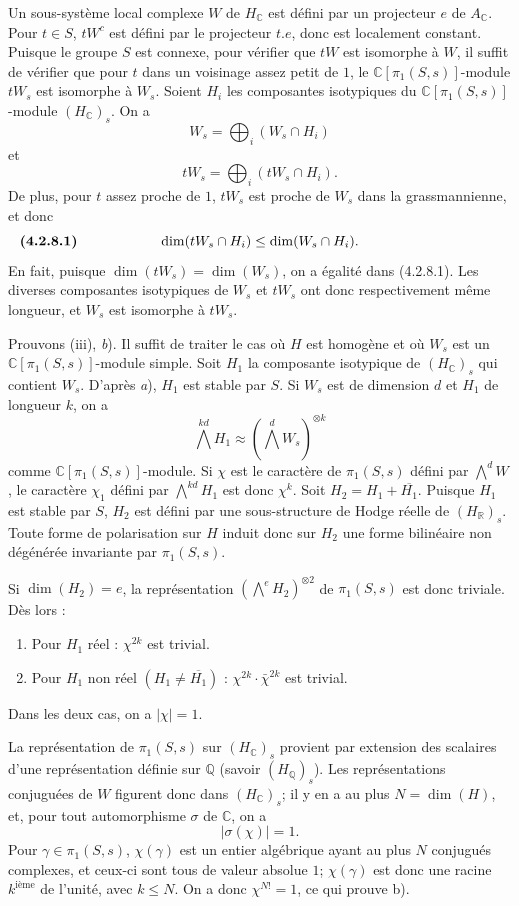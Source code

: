 \documentclass[10pt]{article}
\newcommand{\C}{\mathbb C}
\newcommand{\Q}{\mathbb Q}
\newcommand{\R}{\mathbb R}
\begin{document}
Un sous-système local complexe $W$ de $H_\C$ est défini par un projecteur $e$ de $A_\C$. Pour $t\in S$, $tW^c$ est défini par le projecteur $t.e$, donc est localement constant. Puisque le groupe $S$ est connexe, pour vérifier que $tW$ est isomorphe à $W$, il suffit de vérifier que pour $t$ dans un voisinage assez petit de $1$, le $\C[\pi_1(S,s)]$-module $tW_s$ est isomorphe à $W_s$. Soient $H_i$ les composantes isotypiques du $\C[\pi_1(S,s)]$-module $(H_\C)_s$. On a
\[
W_s=\bigoplus_i(W_s\cap H_i)
\]
et
\[
tW_s=\bigoplus_i(tW_s\cap H_i).
\]
De plus, pour $t$ assez proche de $1$, $tW_s$ est proche de $W_s$ dans la grassmannienne, et donc
\[
\makebox[\textwidth][s]{\textbf{(4.2.8.1)}\hfill$\displaystyle \dim(tW_s\cap H_i)\le \dim(W_s\cap H_i).$\hfill\phantom{\textbf{(4.2.8.1)}}}
\]
En fait, puisque $\dim(tW_s)=\dim(W_s)$, on a égalité dans (4.2.8.1). Les diverses composantes isotypiques de $W_s$ et $tW_s$ ont donc respectivement même longueur, et $W_s$ est isomorphe à $tW_s$.

Prouvons (iii), \textit{b}). Il suffit de traiter le cas où $H$ est homogène et où $W_s$ est un $\C[\pi_1(S,s)]$-module simple. Soit $H_1$ la composante isotypique de $(H_\C)_s$ qui contient $W_s$. D'après \textit{a}), $H_1$ est stable par $S$. Si $W_s$ est de dimension $d$ et $H_1$ de longueur $k$, on a
\[
\bigwedge^{kd}H_1\approx(\bigwedge^dW_s)^{\otimes k}
\]
comme $\C[\pi_1(S,s)]$-module. Si $\chi$ est le caractère de $\pi_1(S,s)$ défini par $\bigwedge^dW$, le caractère $\chi_1$ défini par $\bigwedge^{kd}H_1$ est donc $\chi^k$. Soit $H_2=H_1+\overline{H_1}$. Puisque $H_1$ est stable par $S$, $H_2$ est défini par une sous-structure de Hodge réelle de $(H_\R)_s$. Toute forme de polarisation sur $H$ induit donc sur $H_2$ une forme bilinéaire non dégénérée invariante par $\pi_1(S,s)$.

Si $\dim(H_2)=e$, la représentation $(\bigwedge^eH_2)^{\otimes2}$ de $\pi_1(S,s)$ est donc triviale. Dès lors :
\begin{enumerate}[label=\alph*)]
\item Pour $H_1$ réel : $\chi^{2k}$ est trivial.
\item Pour $H_1$ non réel $(H_1\ne\overline{H_1})$ : $\chi^{2k}\cdot\bar\chi^{2k}$ est trivial.
\end{enumerate}
Dans les deux cas, on a $|\chi|=1$.

La représentation de $\pi_1(S,s)$ sur $(H_\C)_s$ provient par extension des scalaires d'une représentation définie sur $\Q$ (savoir $(H_\Q)_s$). Les représentations conjuguées de $W$ figurent donc dans $(H_\C)_s$; il y en a au plus $N=\dim(H)$, et, pour tout automorphisme $\sigma$ de $\C$, on a
\[
|\sigma(\chi)|=1.
\]
Pour $\gamma\in\pi_1(S,s)$, $\chi(\gamma)$ est un entier algébrique ayant au plus $N$ conjugués complexes, et ceux-ci sont tous de valeur absolue $1$; $\chi(\gamma)$ est donc une racine $k^{\text{ième}}$ de l'unité, avec $k\le N$. On a donc $\chi^{N!}=1$, ce qui prouve b).
\end{document}
